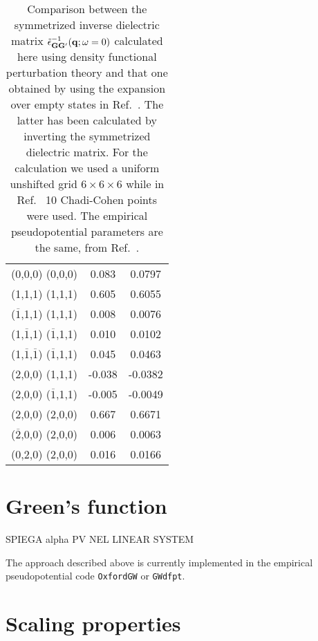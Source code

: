 \documentclass[twocolumn,prb,showpacs,superscriptaddress]{revtex4}
\def\w{\omega}
\def\q{{\bf q}}
\def\G{{\bf G}}
\def\Gp{{\bf G^\prime}}
\def\mo{$\overline{1}$}
\def\mt{$\overline{2}$}
\begin{document}
\begin{table}
\caption{\label{tab.1} Comparison between the symmetrized inverse dielectric matrix
$\tilde\epsilon^{-1}_{\G\Gp}(\q;\w=0)$
calculated here using density functional perturbation theory and that one obtained
by using the expansion over empty states in Ref.\ . The latter has
been calculated by inverting the symmetrized dielectric matrix.
For the calculation we used a uniform unshifted grid $6\times6\times6$ while in
Ref.\  10 Chadi-Cohen points were used. The empirical
pseudopotential parameters are the same, from Ref.\ .}
\begin{ruledtabular}
\begin{tabular}{c|c|c}
(0,0,0) (0,0,0) & \phantom{-}0.083 &  \phantom{-}0.0797  \\
(1,1,1)  (1,1,1)   &   \phantom{-}0.605    & \phantom{-}0.6055 \\
(\mo,1,1) (1,1,1)   &   \phantom{-}0.008  & \phantom{-}0.0076 \\
 (1,\mo,1) (\mo,1,1)  & \phantom{-}0.010 & \phantom{-}0.0102 \\
 (1,\mo,\mo) (\mo,1,1) & \phantom{-}0.045 & \phantom{-}0.0463 \\
 (2,0,0) (1,1,1)    &    -0.038 & -0.0382 \\
 (2,0,0) (\mo,1,1)   &    -0.005 & -0.0049 \\
 (2,0,0) (2,0,0)    &  \phantom{-}0.667 & \phantom{-}0.6671 \\
 (\mt,0,0) (2,0,0)   & \phantom{-}0.006 & \phantom{-}0.0063 \\
 (0,2,0) (2,0,0)    &  \phantom{-}0.016 & \phantom{-}0.0166 \\
\end{tabular}
\end{ruledtabular}
\end{table}


\section{Green's function}


SPIEGA alpha PV NEL LINEAR SYSTEM

The approach described above is currently implemented in the empirical
pseudopotential code {\tt OxfordGW} or {\tt GWdfpt}. 

\section{Scaling properties}
\end{document}

